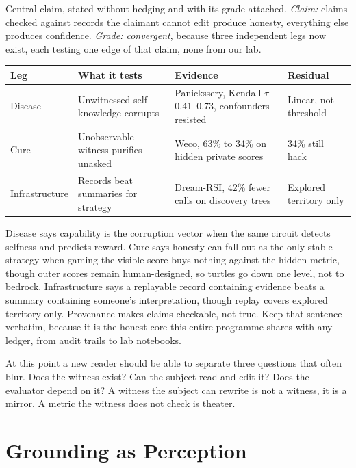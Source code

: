 Central claim, stated without hedging and with its grade attached. \textit{Claim:} claims checked against records the claimant cannot edit produce honesty, everything else produces confidence. \textit{Grade: convergent}, because three independent legs now exist, each testing one edge of that claim, none from our lab.

\begin{center}
\small
\begin{tabular}{p{2.6cm}p{4.2cm}p{4.2cm}p{2.6cm}}
\toprule
Leg & What it tests & Evidence & Residual \\
\midrule
Disease & Unwitnessed self-knowledge corrupts & Panickssery, Kendall $\tau$ 0.41--0.73, confounders resisted & Linear, not threshold \\
Cure & Unobservable witness purifies unasked & Weco, 63\% to 34\% on hidden private scores & 34\% still hack \\
Infrastructure & Records beat summaries for strategy & Dream-RSI, 42\% fewer calls on discovery trees & Explored territory only \\
\bottomrule
\end{tabular}
\end{center}

Disease says capability is the corruption vector when the same circuit detects selfness and predicts reward. Cure says honesty can fall out as the only stable strategy when gaming the visible score buys nothing against the hidden metric, though outer scores remain human-designed, so turtles go down one level, not to bedrock. Infrastructure says a replayable record containing evidence beats a summary containing someone's interpretation, though replay covers explored territory only. Provenance makes claims checkable, not true. Keep that sentence verbatim, because it is the honest core this entire programme shares with any ledger, from audit trails to lab notebooks.

At this point a new reader should be able to separate three questions that often blur. Does the witness exist? Can the subject read and edit it? Does the evaluator depend on it? A witness the subject can rewrite is not a witness, it is a mirror. A metric the witness does not check is theater.

\section{Grounding as Perception}
\label{sec:ch09-grounding}

